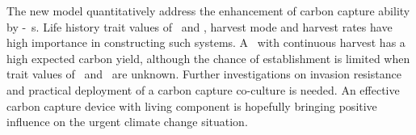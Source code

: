 \documentclass[../thesis.tex]{subfiles} %
\begin{document}
The new model quantitatively address the enhancement of carbon capture ability by \phy-\bac\ \pbs s.  Life history trait values of \phy\ and \bac, harvest mode and harvest rates have high importance in constructing such systems.  A \pbs\ with continuous harvest has a high expected carbon yield, although the chance of establishment is limited when trait values of \phy\ and \bac\ are unknown.  Further investigations on invasion resistance and practical deployment of a carbon capture co-culture is needed.  An effective carbon capture device with living component is hopefully bringing positive influence on the urgent climate change situation.
\end{document}
